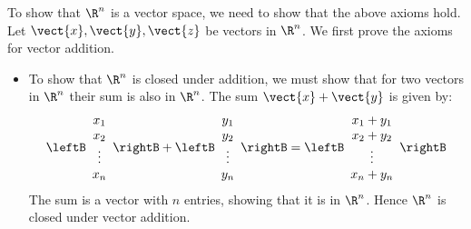 \begin{solution}
To show that $\R^n$ is a vector space, we need to show that the above axioms hold. Let $\vect{x}, \vect{y}, \vect{z}$ be vectors in $\R^n$. We first prove the axioms for vector addition. 
\begin{itemize}
\item 
To show that $\R^n$ is closed under addition, we must show that for two vectors in $\R^n$ their sum is also in $\R^n$. The sum $\vect{x} + \vect{y}$ is given by:
\[
\leftB \begin{array}{c}
x_1 \\
x_2 \\
\vdots \\
x_n
\end{array}\rightB + 
\leftB \begin{array}{c}
y_1 \\
y_2 \\
\vdots \\
y_n
\end{array}\rightB = 
\leftB \begin{array}{c}
x_1 + y_1 \\
x_2 + y_2 \\
\vdots \\
x_n + y_n
\end{array}\rightB
\]
The sum is a vector with $n$ entries, showing that it is in $\R^n$. Hence $\R^n$ is closed under vector addition.


\end{itemize}
\end{solution}
